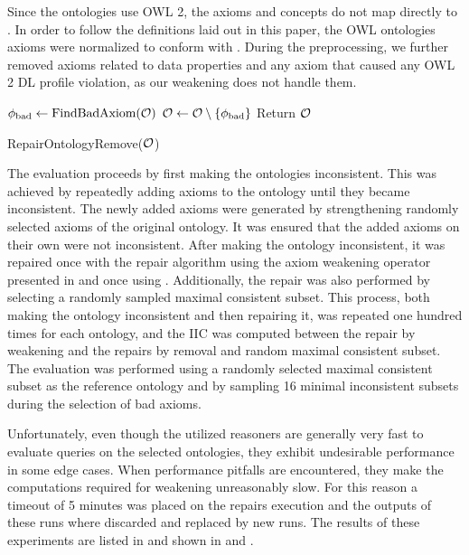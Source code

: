 \documentclass[
]{ceurart}
\begin{document}
Since the ontologies use OWL 2, the axioms and concepts do not map directly to \SROIQ. In order to follow the definitions laid out in this paper, the OWL ontologies axioms were normalized to conform with \SROIQ. During the preprocessing, we further removed axioms related to data properties and any axiom that caused any OWL 2 DL profile violation, as our weakening does not handle them.

\begin{algorithm}[t]
  \begin{algorithmic}
      \State $\phi_\textnormal{bad} \gets \textnormal{FindBadAxiom}(\mathcal{O})$
      \State $\mathcal{O} \gets \mathcal{O} \setminus \{\phi_\textnormal{bad}\}$
    \EndWhile
    \State Return $\mathcal{O}$
  \end{algorithmic}
  \caption{RepairOntologyRemove($\mathcal{O}$)}
	\label{algo:repair-remove}
\end{algorithm}

The evaluation proceeds by first making the ontologies inconsistent. This was achieved by repeatedly adding axioms to the ontology until they became inconsistent. The newly added axioms were generated by strengthening randomly selected axioms of the original ontology. It was ensured that the added axioms on their own were not inconsistent. After making the ontology inconsistent, it was repaired once with the repair algorithm using the axiom weakening operator presented in  and once using . Additionally, the repair was also performed by selecting a randomly sampled maximal consistent subset. This process, both making the ontology inconsistent and then repairing it, was repeated one hundred times for each ontology, and the IIC was computed between the repair by weakening and the repairs by removal and random maximal consistent subset. The evaluation was performed using a randomly selected maximal consistent subset as the reference ontology and by sampling 16 minimal inconsistent subsets during the selection of bad axioms.

Unfortunately, even though the utilized reasoners are generally very fast to evaluate queries on the selected ontologies, they exhibit undesirable performance in some edge cases. When performance pitfalls are encountered, they make the computations required for weakening unreasonably slow. For this reason a timeout of 5 minutes was placed on the repairs execution and the outputs of these runs where discarded and replaced by new runs. The results of these experiments are listed in  and shown in  and .
\end{document}
